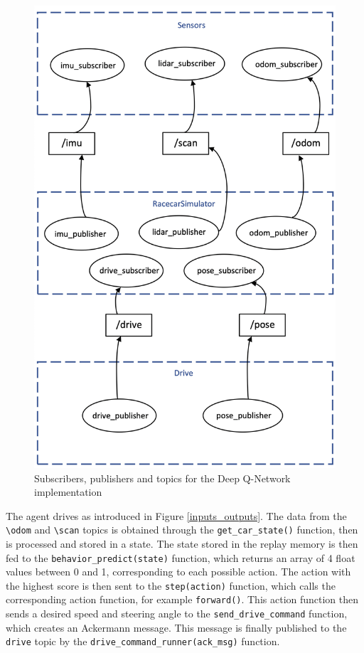 \begin{figure}[H]
\centering
\includegraphics[scale=0.33]{Figures/pub_sub.png}
\caption{Subscribers, publishers and topics for the Deep Q-Network implementation}
\label{pub_sub}
\end{figure}
The agent drives as introduced in Figure \ref{inputs_outputs}. The data from the \verb|\odom| and \verb|\scan| topics is obtained through the \verb|get_car_state()| function, then is processed and stored in a state. The state stored in the replay memory is then fed to the \verb|behavior_predict(state)| function, which returns an array of 4 float values between 0 and 1, corresponding to each possible action. The action with the highest score is then sent to the \verb|step(action)| function, which calls the corresponding action function, for example \verb|forward()|. This action function then sends a desired speed and steering angle to the \verb|send_drive_command| function, which creates an Ackermann message. This message is finally published to the \verb|drive| topic by the \verb|drive_command_runner(ack_msg)| function.
